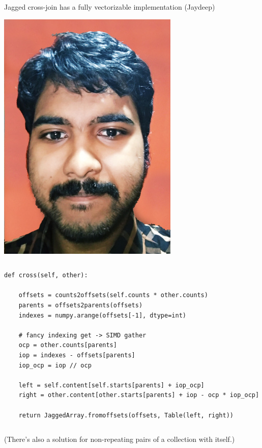 \documentclass[aspectratio=169]{beamer}
\begin{document}
\begin{frame}[fragile]{Jagged cross-join has a fully vectorizable implementation (Jaydeep)}
\small
\vspace{0.2 cm}

\hfill \mbox{\includegraphics[height=2.5 cm]{jaydeep.jpg}\hspace{-0.75 cm}}

\vspace{-2.7 cm}
\begin{columns}
\begin{verbatim}
def cross(self, other):

    offsets = counts2offsets(self.counts * other.counts)
    parents = offsets2parents(offsets)
    indexes = numpy.arange(offsets[-1], dtype=int)

    # fancy indexing get -> SIMD gather
    ocp = other.counts[parents]
    iop = indexes - offsets[parents]
    iop_ocp = iop // ocp

    left = self.content[self.starts[parents] + iop_ocp]
    right = other.content[other.starts[parents] + iop - ocp * iop_ocp]

    return JaggedArray.fromoffsets(offsets, Table(left, right))
\end{verbatim}
\end{columns}

\normalsize
\vspace{0.5 cm}
(There's also a solution for non-repeating pairs of a collection with itself.)
\end{frame}
\end{document}
